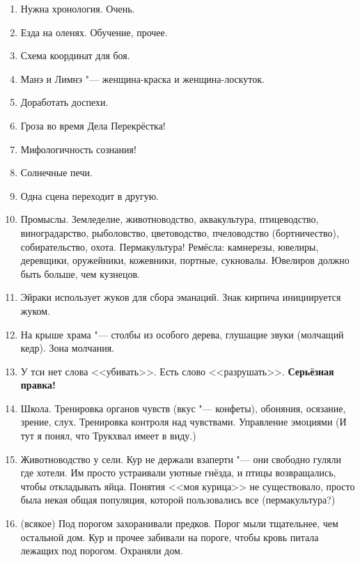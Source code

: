 \begin{enumerate}
\item Нужна хронология.
Очень.

\item Езда на оленях.
Обучение, прочее.

\item Схема координат для боя.

\item Манэ и Лимнэ "--- женщина-краска и женщина-лоскуток.

\item Доработать доспехи.

\item Гроза во время Дела Перекрёстка!

\item Мифологичность сознания!

\item Солнечные печи.

\item Одна сцена переходит в другую.

\item Промыслы.
Земледелие, животноводство, аквакультура, птицеводство, виноградарство, рыболовство, цветоводство, пчеловодство (бортничество), собирательство, охота.
Пермакультура!
Ремёсла: камнерезы, ювелиры, деревщики, оружейники, кожевники, портные, сукновалы.
Ювелиров должно быть больше, чем кузнецов.

\item Эйраки использует жуков для сбора эманаций.
Знак кирпича инициируется жуком.

\item На крыше храма "--- столбы из особого дерева, глушащие звуки (молчащий кедр).
Зона молчания.

\item У тси нет слова <<убивать>>.
Есть слово <<разрушать>>.
\textbf{Серьёзная правка!}

\item Школа.
Тренировка органов чувств (вкус "--- конфеты), обоняния, осязание, зрение, слух.
Тренировка контроля над чувствами.
Управление эмоциями (И тут я понял, что Трукхвал имеет в виду.)

\item Животноводство у сели.
Кур не держали взаперти "--- они свободно гуляли где хотели.
Им просто устраивали уютные гнёзда, и птицы возвращались, чтобы откладывать яйца.
Понятия <<моя курица>> не существовало, просто была некая общая популяция, которой пользовались все (пермакультура?)

\item (всякое) Под порогом захоранивали предков.
Порог мыли тщательнее, чем остальной дом.
Кур и прочее забивали на пороге, чтобы кровь питала лежащих под порогом.
Охраняли дом.


\end{enumerate}
